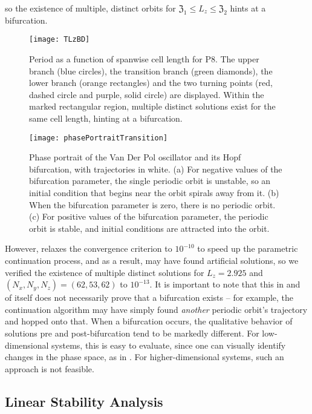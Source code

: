  so  the existence of multiple, distinct orbits for $\mathfrak{Z}_1 \leq L_z \leq \mathfrak{Z}_2$ hints at a bifurcation.
\begin{figure}[t]
\texttt{[image: TLzBD]}
\caption{Period as a function of spanwise cell length for P8. The {upper branch} (blue circles), the {transition branch} (green diamonds), the { lower branch} (orange rectangles) and the two turning points (red, dashed circle and purple, solid circle) are displayed. Within the marked rectangular region, multiple distinct solutions exist for the same cell length, hinting at a bifurcation.}\label{fig:LZBif}
\end{figure}
\begin{figure}[t]
\texttt{[image: phasePortraitTransition]}
\caption{Phase portrait of the Van Der Pol oscillator and its Hopf bifurcation, with trajectories in white. (a) For negative values of the bifurcation parameter, the single periodic orbit is unstable, so an initial condition that begins near the orbit spirals away from it. (b) When the bifurcation parameter is zero, there is no periodic orbit. (c) For positive values of the bifurcation parameter, the periodic orbit is stable, and initial conditions are attracted into the orbit.}\label{fig:phasePortrait}
\end{figure}
However,  relaxes the convergence criterion to $10^{-10}$ to speed up the parametric continuation process, and as a result, may have found artificial solutions, so we verified the existence of multiple distinct solutions for $L_z = 2.925$ and $(N_x,N_y,N_z) = (62,53,62)$ to $10^{-13}$. It is important to note that this in and of itself does not necessarily prove that a bifurcation exists -- for example, the continuation algorithm may have simply found \emph{another} periodic orbit's trajectory and hopped onto that. When a bifurcation occurs, the qualitative behavior of solutions pre and post-bifurcation tend to be markedly different. For low-dimensional systems, this is easy to evaluate, since one can visually identify changes in the phase space, as in . For higher-dimensional systems, such an approach is not feasible. 

\subsection{Linear Stability Analysis}\label{sec:LSA}

